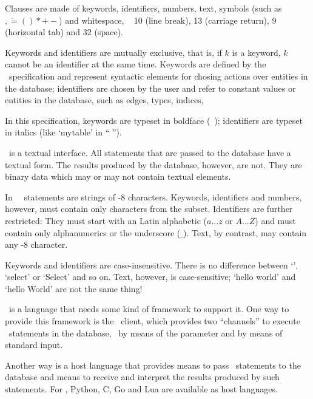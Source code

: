 Clauses are made of keywords, identifiers, numbers, text,
symbols (such as $, \dot = ( ) * + -$) and
whitespace, \ie\ 
10 (line break),
13 (carriage return),
9  (horizontal tab)
and 32 (space).

Keywords and identifiers are mutually
exclusive, that is, if $k$ is a keyword,
$k$ cannot be an identifier at the same time.
Keywords are defined by the \sql\ specification
and represent syntactic elements for chosing actions
over entities in the database;
identifiers are chosen by the user
and refer to constant values or
entities in the database,
such as edges, types, indices, \etc\

In this specification,
keywords are typeset in boldface
(\eg\ );
identifiers are typeset in italics
(like `mytable' in 
`` '').

\sql\ is a textual interface.
All statements that are passed to the database
have a textual form. The results produced
by the database, however, are not. They are
binary data which may or may not
contain textual elements.

In \nowdb\ \sql\ statements are strings
of -8 characters.
Keywords, identifiers and numbers, however,
must contain only characters
from the  subset.
Identifiers are further restricted:
They must start with an  
Latin alphabetic ($a\dots z$ or $A \dots Z$)
and must contain only
alphanumerics or the underscore ($\_$).
Text, by contrast, may contain any
-8 character.

Keywords and identifiers are case-insensitive.
There is no difference between
`', `select' or `Select'
and so on.
Text, however, is case-sensitive;
`hello world' and `hello World'
are not the same thing!

\sql\ is a  language
that needs some kind of framework
to support it. One way to provide this
framework is the \nowdb\ client,
which provides two ``channels'' to execute
\sql\ statements in the database,
\ie\ by means of the  parameter
and by means of standard input.

Another way is a host language
that provides means to pass \sql\ statements
to the database and means to receive
and interpret the results produced by such statements.
For \nowdb, Python, C, Go and Lua
are available as host languages.

